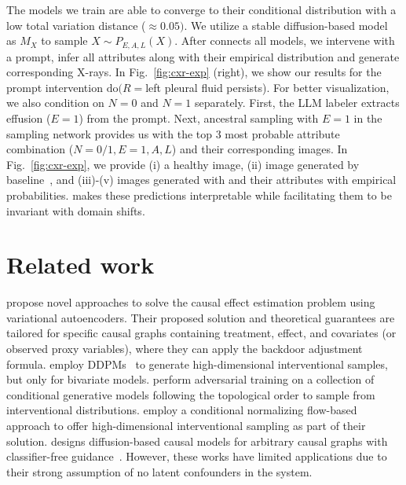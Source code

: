 \documentclass{article}
\newcommand{\Do}{\text{do}}
\newcommand{\idgen}{\text{ID-GEN}\xspace}
\theoremstyle{plain}
\theoremstyle{definition}
\theoremstyle{remark}
\begin{document}
%
%
%
The models we train are able to converge to their conditional distribution with a low total variation distance ($\approx 0.05)$.
%
%
We utilize a stable diffusion-based model~\cite{chambon2022roentgen} as $M_X$ to sample $X\sim P_{E, A, L}(X)$.
%
%
After \idgen connects all models, we intervene with a prompt, infer all attributes along with their empirical distribution and generate corresponding X-rays. 
%
%
 In Fig.~\ref{fig:cxr-exp} (right), we show our results for the prompt intervention $\Do(R=$left pleural fluid persists). For better visualization, we also condition on $N=0$ and $N=1$ separately. First, the LLM labeler extracts effusion ($E=1$) from the prompt. Next, ancestral sampling with $E=1$ in the sampling network provides us with the top 3 most probable attribute combination ($N=0/1, E=1, A, L$) and their corresponding images.
 In Fig.~\ref{fig:cxr-exp}, we provide (i) a healthy image, (ii) image generated by baseline~\cite{chambon2022roentgen}, and (iii)-(v) images generated with \idgen and their attributes with empirical probabilities. 
\idgen makes these predictions
interpretable while facilitating them to be invariant with domain shifts.
%
%
%
\section{Related work}
\citet{shalit2017estimating,louizos2017causal, zhang2021treatment, vo2022adaptive}  propose novel approaches to solve the causal effect estimation problem using variational autoencoders. Their proposed solution and theoretical guarantees are tailored for specific causal graphs containing treatment, effect, and covariates (or observed proxy variables), where they can apply the backdoor adjustment formula. \citet{sanchez2022diffusion} employ DDPMs~\citep{ho2020denoising} to generate high-dimensional interventional samples, but only for bivariate models.
\citet{kocaoglu2018causalgan} perform adversarial training on a collection of conditional generative models following the topological order to sample from interventional distributions.
\citet{pawlowski2020deep} employ a conditional normalizing flow-based approach to offer high-dimensional interventional sampling as part of their solution.  
\citet{chao2023interventional} designs diffusion-based causal models for arbitrary causal graphs with classifier-free guidance~\citep{ho2022classifier}.
However, these works have limited applications due to their strong assumption of no latent confounders in the system. 
\end{document}
